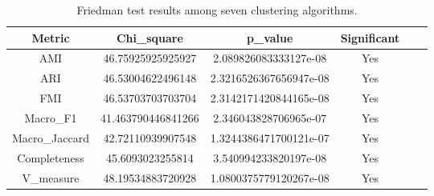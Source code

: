 
\begin{table}[ht]
\centering
\caption{
Friedman test results among seven clustering algorithms.
}
\label{
tab:S3_friedman
}

\begin{tabular}{cccccc}
\toprule
Metric & Chi_square & p_value & Significant\\

\midrule
AMI & 46.75925925925927 & 2.089826083333127e-08 & Yes\\
ARI & 46.53004622496148 & 2.3216526367656947e-08 & Yes\\
FMI & 46.53703703703704 & 2.3142171420844165e-08 & Yes\\
Macro_F1 & 41.463790446841266 & 2.346043828706965e-07 & Yes\\
Macro_Jaccard & 42.72110939907548 & 1.3244386471700121e-07 & Yes\\
Completeness & 45.6093023255814 & 3.540994233820197e-08 & Yes\\
V_measure & 48.19534883720928 & 1.0800375779120267e-08 & Yes\\

\bottomrule
\end{tabular}
\end{table}
